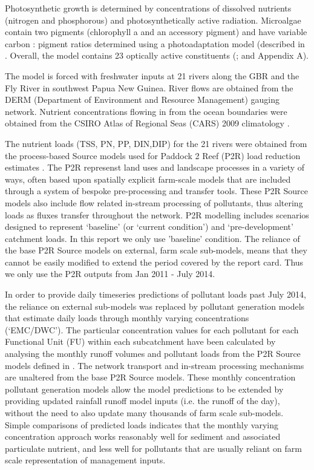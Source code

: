 \documentclass{elsart}
\begin{document}
Photosynthetic growth is determined by concentrations of dissolved nutrients (nitrogen and phosphorous) and photosynthetically active radiation. Microalgae contain two pigments (chlorophyll a and an accessory pigment) and have variable carbon : pigment ratios determined using a photoadaptation model (described in \citet{Baird13}. Overall, the model contains 23 optically active constituents (\citet{Baird16a}; and Appendix A).

The model is forced with freshwater inputs at 21 rivers along the GBR and the Fly River in southwest Papua New Guinea. River flows are obtained from the DERM (Department of Environment and Resource Management) gauging network. Nutrient concentrations flowing in from the ocean boundaries were obtained from the CSIRO Atlas of Regional Seas (CARS) 2009 climatology \citep{Ridgway02}. 

The nutrient loads (TSS, PN, PP, DIN,DIP) for the 21 rivers were obtained from the process-based Source models used for Paddock 2 Reef (P2R) load reduction estimates \citep{Waters14}. The P2R represenst land uses and landscape processes in a variety of ways, often based upon spatially explicit farm-scale models that are included through a system of bespoke pre-processing and transfer tools. These P2R Source models also include flow related in-stream processing of pollutants, thus altering loads as fluxes transfer throughout the network. P2R modelling includes scenarios designed to represent ‘baseline’ (or ‘current condition’) and ‘pre-development’ catchment loads. In this report we only use 'baseline' condition. The reliance of the base P2R Source models on external, farm scale sub-models, means that they cannot be easily modified to extend the period covered by the report card. Thus we only use the P2R outputs from Jan 2011 - July 2014. 

In order to provide daily timeseries predictions of pollutant loads past July 2014, the reliance on external sub-models was replaced by pollutant generation models that estimate daily loads through monthly varying concentrations (‘EMC/DWC’). The particular concentration values for each pollutant for each Functional Unit (FU) within each subcatchment have been calculated by analysing the monthly runoff volumes and pollutant loads from the P2R Source models defined in \citet{Waters14}. The network transport and in-stream processing mechanisms are unaltered from the base P2R Source models. These monthly concentration pollutant generation models allow the model predictions to be extended by providing updated rainfall runoff model inputs (i.e. the runoff of the day), without the need to also update many thousands of farm scale sub-models. Simple comparisons of predicted loads indicates that the monthly varying concentration approach works reasonably well for sediment and associated particulate nutrient, and less well for pollutants that are usually reliant on farm scale representation of management inputs.
\end{document}
